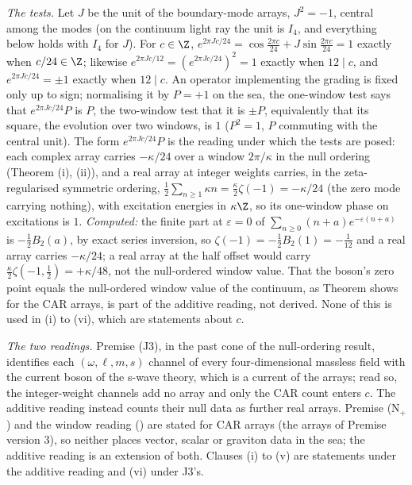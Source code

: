\emph{The tests.} Let $J$ be the unit of the boundary-mode arrays, $J^{2} = -1$, central among the modes (on the continuum light ray the unit is $I_{4}$, and everything below holds with $I_{4}$ for $J$). For $c \in \Z$, $e^{2\pi Jc/24} = \cos\tfrac{2\pi c}{24} + J\sin\tfrac{2\pi c}{24} = 1$ exactly when $c/24 \in \Z$; likewise $e^{2\pi Jc/12} = (e^{2\pi Jc/24})^{2} = 1$ exactly when $12 \mid c$, and $e^{2\pi Jc/24} = \pm1$ exactly when $12 \mid c$. An operator implementing the grading is fixed only up to sign; normalising it by $P = +1$ on the sea, the one-window test says that $e^{2\pi Jc/24}P$ is $P$, the two-window test that it is $\pm P$, equivalently that its square, the evolution over two windows, is $1$ ($P^{2} = 1$, $P$ commuting with the central unit). The form $e^{2\pi Jc/24}P$ is the reading under which the tests are posed: each complex array carries $-\kappa/24$ over a window $2\pi/\kappa$ in the null ordering (Theorem (i), (ii)), and a real array at integer weights carries, in the zeta-regularised symmetric ordering, $\tfrac12\sum_{n \ge 1}\kappa n = \tfrac{\kappa}{2}\zeta(-1) = -\kappa/24$ (the zero mode carrying nothing), with excitation energies in $\kappa\Z$, so its one-window phase on excitations is $1$. \emph{Computed:} the finite part at $\varepsilon = 0$ of $\sum_{n \ge 0}(n + a)e^{-\varepsilon(n + a)}$ is $-\tfrac12B_{2}(a)$, by exact series inversion, so $\zeta(-1) = -\tfrac12B_{2}(1) = -\tfrac1{12}$ and a real array carries $-\kappa/24$; a real array at the half offset would carry $\tfrac{\kappa}{2}\zeta(-1, \tfrac12) = +\kappa/48$, not the null-ordered window value. That the boson's zero point equals the null-ordered window value of the continuum, as Theorem  shows for the CAR arrays, is part of the additive reading, not derived. None of this is used in (i) to (vi), which are statements about $c$.

\emph{The two readings.} Premise  (J3), in the past cone of the null-ordering result, identifies each $(\omega, \ell, m, s)$ channel of every four-dimensional massless field with the current boson of the s-wave theory, which is a current of the arrays; read so, the integer-weight channels add no array and only the CAR count enters $c$. The additive reading instead counts their null data as further real arrays. Premise (N$_{+}$) and the window reading () are stated for CAR arrays (the arrays of Premise  version 3), so neither places vector, scalar or graviton data in the sea; the additive reading is an extension of both. Clauses (i) to (v) are statements under the additive reading and (vi) under J3's.


